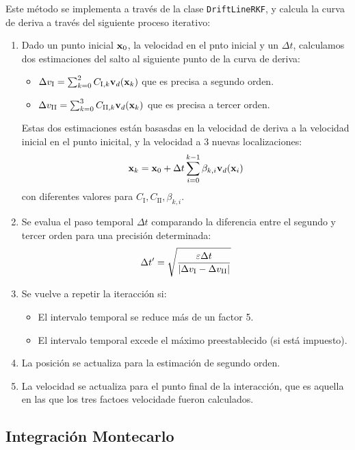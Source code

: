 Este método se implementa a través de la clase \texttt{DriftLineRKF}, y calcula la curva de deriva a través del siguiente proceso iterativo: 

\begin{enumerate}
    \item Dado un punto inicial $\mathbf{x}_0$, la velocidad en el pnto inicial y un $\Delta t$, calculamos dos estimaciones del salto al siguiente punto de la curva de deriva: 
    \begin{itemize}
        \item \(\Delta v_\text{I} = \sum_{k=0}^{2} C_{\text{I},k}\mathbf{v}_d(\mathbf{x}_k)\) que es precisa a segundo orden.
        \item \(\Delta v_{\text{II}} = \sum_{k=0}^{3} C_{\text{II},k}\mathbf{v}_d(\mathbf{x}_k)\) que es precisa a tercer orden. 
    \end{itemize}
    Estas dos estimaciones están basasdas en la velocidad de deriva a la velocidad inicial en el punto inicital, y la velocidad a 3 nuevas localizaciones: 
    \begin{equation}
        \mathbf{x}_k = \mathbf{x}_0 + \Delta t \sum_{i=0}^{k-1} \beta_{k,i} \mathbf{v}_d (\mathbf{x}_i)
    \end{equation}
    con diferentes valores para $C_\text{I},C_\text{II},\beta_{k,i}$. 
    \item Se evalua el paso temporal $\Delta t$ comparando la diferencia entre el segundo y tercer orden para una precisión determinada: 
    \begin{equation}
        \Delta t' = \sqrt{\frac{\varepsilon \Delta t}{\vqty{\Delta v_{\text{I}}-\Delta v_{\text{II}}}}}
    \end{equation}
    \item Se vuelve a repetir la iteracción si:
    \begin{itemize}
        \item El intervalo temporal se reduce más de un factor 5.
        \item El intervalo temporal excede el máximo preestablecido (si está impuesto).
    \end{itemize}
    \item La posición se actualiza para la estimación de segundo orden.
    \item La velocidad se actualiza para el punto final de la interacción, que es aquella en las que los tres factoes velocidade fueron calculados. 
\end{enumerate}

\subsection{Integración Montecarlo}

